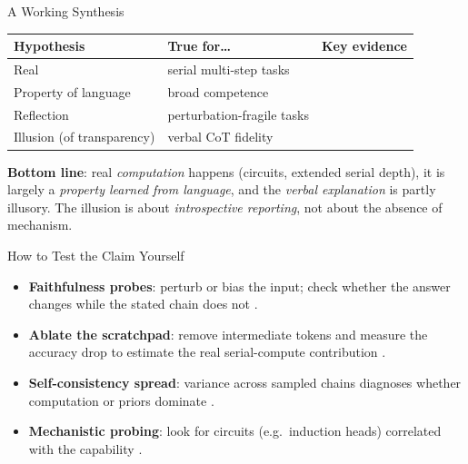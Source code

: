 \documentclass[aspectratio=169,11pt]{beamer}
\begin{document}
\begin{frame}{A Working Synthesis}
  \begin{table}
    \centering
    \begin{tabular}{@{}lll@{}}
      \toprule
      Hypothesis & True for\dots & Key evidence \\
      \midrule
      Real & serial multi-step tasks & \citep{nye2021scratchpad,wei2022chain} \\
      Property of language & broad competence & \citep{brown2020language} \\
      Reflection & perturbation-fragile tasks & \citep{mccoy2019right} \\
      Illusion (of transparency) & verbal CoT fidelity & \citep{turpin2023language} \\
      \bottomrule
    \end{tabular}
  \end{table}
  \textbf{Bottom line}: real \emph{computation} happens (circuits, extended serial depth), it is largely a \emph{property learned from language}, and the \emph{verbal explanation} is partly illusory. The illusion is about \emph{introspective reporting}, not about the absence of mechanism.
\end{frame}

\begin{frame}{How to Test the Claim Yourself}
  \begin{itemize}
    \item \textbf{Faithfulness probes}: perturb or bias the input; check whether the answer changes while the stated chain does not \citep{turpin2023language}.
    \item \textbf{Ablate the scratchpad}: remove intermediate tokens and measure the accuracy drop to estimate the real serial-compute contribution \citep{nye2021scratchpad}.
    \item \textbf{Self-consistency spread}: variance across sampled chains diagnoses whether computation or priors dominate \citep{wang2022selfconsistency}.
    \item \textbf{Mechanistic probing}: look for circuits (e.g.\ induction heads) correlated with the capability \citep{olsson2022incontext}.
  \end{itemize}
\end{frame}
\end{document}
